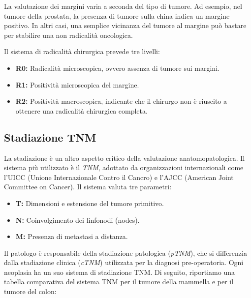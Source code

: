 La valutazione dei margini varia a seconda del tipo di tumore. Ad esempio, nel tumore della prostata, la presenza di tumore sulla china indica un margine positivo. In altri casi, una semplice vicinanza del tumore al margine può bastare per stabilire una non radicalità oncologica.

Il sistema di radicalità chirurgica prevede tre livelli:
\begin{itemize}
    \item \textbf{R0:} Radicalità microscopica, ovvero assenza di tumore sui margini.
    \item \textbf{R1:} Positività microscopica del margine.
    \item \textbf{R2:} Positività macroscopica, indicante che il chirurgo non è riuscito a ottenere una radicalità chirurgica completa.
\end{itemize}

\subsection{Stadiazione TNM}
La stadiazione è un altro aspetto critico della valutazione anatomopatologica. Il sistema più utilizzato è il \textit{TNM}, adottato da organizzazioni internazionali come l'UICC (Unione Internazionale Contro il Cancro) e l'AJCC (American Joint Committee on Cancer). Il sistema valuta tre parametri:
\begin{itemize}
    \item \textbf{T:} Dimensioni e estensione del tumore primitivo.
    \item \textbf{N:} Coinvolgimento dei linfonodi (nodes).
    \item \textbf{M:} Presenza di metastasi a distanza.
\end{itemize}

Il patologo è responsabile della stadiazione patologica (\textit{pTNM}), che si differenzia dalla stadiazione clinica (\textit{cTNM}) utilizzata per la diagnosi pre-operatoria. Ogni neoplasia ha un suo sistema di stadiazione TNM. Di seguito, riportiamo una tabella comparativa del sistema TNM per il tumore della mammella e per il tumore del colon:

